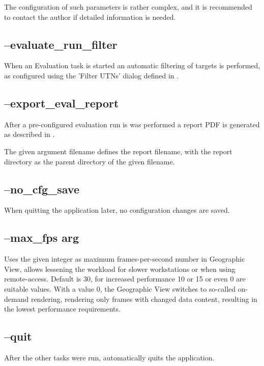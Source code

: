 The configuration of such parameters is rather complex, and it is recommended to contact the author if detailed information is needed.

\subsection{--evaluate\_run\_filter}

When an Evaluation task is started an automatic filtering of targets is performed, as configured using the 'Filter UTNs' dialog defined in .


\subsection{--export\_eval\_report}

After a pre-configured evaluation run is was performed a report PDF is generated as described in .

The given argument filename defines the report filename, with the report directory as the parent directory of the given filename.

\subsection{--no\_cfg\_save}

When quitting the application later, no configuration changes are saved.

\subsection{--max\_fps arg}

Uses the given integer as maximum frames-per-second number in Geographic View, allows lessening the workload for slower workstations or when using remote-access. Default is 30, for increased performance 10 or 15 or even 0 are suitable values. With a value 0, the Geographic View switches to so-called on-demand rendering, rendering only frames with changed data content, resulting in the lowest performance requirements.

\subsection{--quit}

After the other tasks were run, automatically quits the application.


